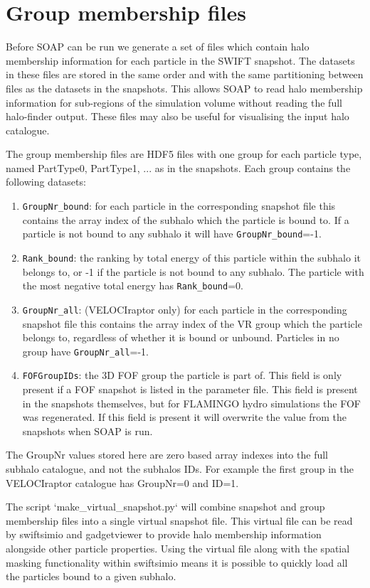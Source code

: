 \documentclass{article}
\begin{document}
\section{Group membership files}

Before SOAP can be run we generate a set of files which contain halo
membership information for each particle in the SWIFT snapshot. The
datasets in these files are stored in the same order and with the same
partitioning between files as the datasets in the snapshots. This
allows SOAP to read halo membership information for sub-regions of the
simulation volume without reading the full halo-finder output. These files may
also be useful for visualising the input halo catalogue.

The group membership files are HDF5 files with one group for each
particle type, named PartType0, PartType1, ... as in the
snapshots. Each group contains the following datasets:

\begin{enumerate}
\item \verb|GroupNr_bound|: for each particle in the corresponding snapshot
  file this contains the array index of the subhalo which the
  particle is bound to. If a particle is not bound to any subhalo it
  will have \verb|GroupNr_bound|=-1.
\item \verb|Rank_bound|: the ranking by total energy of this particle within
  the subhalo it belongs to, or -1 if the particle is not bound to
  any subhalo. The particle with the most negative total energy has
  \verb|Rank_bound|=0.
\item \verb|GroupNr_all|: (VELOCIraptor only) for each particle in the
  corresponding snapshot
  file this contains the array index of the VR group which the
  particle belongs to, regardless of whether it is bound or
  unbound. Particles in no group have \verb|GroupNr_all|=-1.
\item \verb|FOFGroupIDs|: the 3D FOF group the particle is part of.
  This field is only present if a FOF snapshot is listed in the
  parameter file. This field is present in the snapshots themselves,
  but for FLAMINGO hydro simulations the FOF was regenerated. If this
  field is present it will overwrite the value from the snapshots when
  SOAP is run.
\end{enumerate}

The GroupNr values stored here are zero based array indexes into the
full subhalo catalogue, and not the subhalos IDs. For example the first group
in the VELOCIraptor catalogue has GroupNr=0 and ID=1.

The script `make\_virtual\_snapshot.py` will combine snapshot and group membership files
into a single virtual snapshot file. This virtual file can be read by swiftsimio and 
gadgetviewer to provide halo membership information alongside other particle properties.
Using the virtual file along with the spatial masking functionality within swiftsimio
means it is possible to quickly load all the particles bound to a given subhalo.
\end{document}
